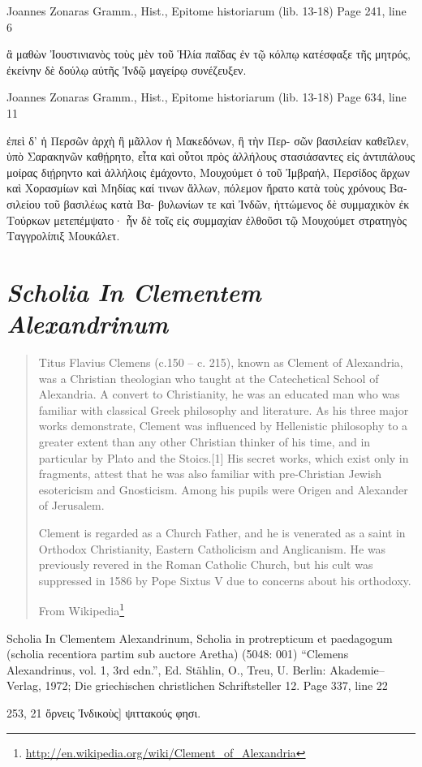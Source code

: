 \documentclass[12pt,letterpaper,twoside,final]{memoir}
\begin{document}
\begin{greek}
Joannes Zonaras Gramm., Hist., Epitome historiarum (lib. 13-18) 
Page 241, line 6

ἃ μαθὼν Ἰουστινιανὸς τοὺς μὲν τοῦ Ἡλία παῖδας ἐν τῷ κόλπῳ 
κατέσφαξε τῆς μητρός, ἐκείνην δὲ δούλῳ αὐτῆς Ἰνδῷ μαγείρῳ 
συνέζευξεν. 



Joannes Zonaras Gramm., Hist., Epitome historiarum (lib. 13-18) 
Page 634, line 11

ἐπεὶ δ' ἡ Περσῶν ἀρχὴ ἢ μᾶλλον ἡ Μακεδόνων, ἣ τὴν Περ-
σῶν βασιλείαν καθεῖλεν, ὑπὸ Σαρακηνῶν καθῄρητο, εἶτα καὶ 
οὗτοι πρὸς ἀλλήλους στασιάσαντες εἰς ἀντιπάλους μοίρας διῄρηντο 
καὶ ἀλλήλοις ἐμάχοντο, Μουχούμετ ὁ τοῦ Ἰμβραήλ, Περσίδος 
ἄρχων καὶ Χορασμίων καὶ Μηδίας καί τινων ἄλλων, πόλεμον 
ἤρατο κατὰ τοὺς χρόνους Βασιλείου τοῦ βασιλέως κατὰ Βα-
βυλωνίων τε καὶ Ἰνδῶν, ἡττώμενος δὲ συμμαχικὸν ἐκ Τούρκων 
μετεπέμψατο· ἦν δὲ τοῖς εἰς συμμαχίαν ἐλθοῦσι τῷ Μουχούμετ 
στρατηγὸς Ταγγρολίπιξ Μουκάλετ. 

\end{greek}



\section{\emph{Scholia In Clementem Alexandrinum}}
\blockquote[From Wikipedia\footnote{\url{http://en.wikipedia.org/wiki/Clement_of_Alexandria}}]{Titus Flavius Clemens (c.150 – c. 215), known as Clement of Alexandria, was a Christian theologian who taught at the Catechetical School of Alexandria. A convert to Christianity, he was an educated man who was familiar with classical Greek philosophy and literature. As his three major works demonstrate, Clement was influenced by Hellenistic philosophy to a greater extent than any other Christian thinker of his time, and in particular by Plato and the Stoics.[1] His secret works, which exist only in fragments, attest that he was also familiar with pre-Christian Jewish esotericism and Gnosticism. Among his pupils were Origen and Alexander of Jerusalem.

Clement is regarded as a Church Father, and he is venerated as a saint in Orthodox Christianity, Eastern Catholicism and Anglicanism. He was previously revered in the Roman Catholic Church, but his cult was suppressed in 1586 by Pope Sixtus V due to concerns about his orthodoxy.}
\begin{greek}

Scholia In Clementem Alexandrinum, Scholia in protrepticum et paedagogum (scholia recentiora partim sub auctore Aretha) (5048: 001)
“Clemens Alexandrinus, vol. 1, 3rd edn.”, Ed. Stählin, O., Treu, U.
Berlin: Akademie–Verlag, 1972; Die griechischen christlichen Schriftsteller 12.
Page 337, line 22

253, 21 ὄρνεις Ἰνδικοὺς] ψιττακούς φησι. 

\end{greek}
\end{document}
